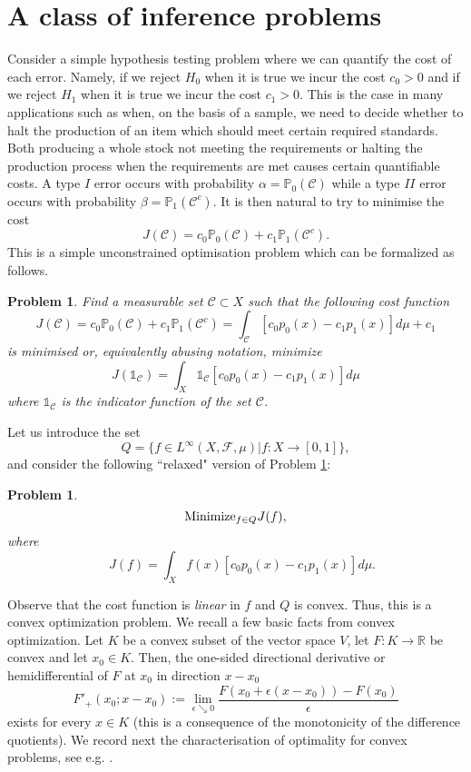 \documentclass[preprint,aps,showkeys,12pt]{revtex4}
\newtheorem{problem}[theorem]{Problem}
\begin{document}
\section{A class of inference problems}
Consider a simple hypothesis testing problem where we can quantify the cost of each error. Namely, if we reject $H_0$ when it is true we incur the cost $c_0>0$ and if we reject $H_1$ when it is true we incur the cost $c_1>0$. This is the case in many applications such as when, on the basis of a sample, we need to decide whether to halt the production of an item which should meet certain required standards. Both producing a whole stock not meeting the requirements or halting the production process when the requirements are met causes certain quantifiable costs. A type $I$ error occurs with probability $\alpha={\mathbb{P}}_0(\mathcal C)$ while a type $II$ error occurs  with probability $\beta={\mathbb{P}}_1(\mathcal C^c)$. It is then natural to try to minimise the cost
$$J (\mathcal C)=c_0{\mathbb{P}}_0(\mathcal C)+c_1{\mathbb{P}}_1(\mathcal C^c).
$$
This is a simple unconstrained optimisation problem which can be formalized as follows.
\begin{problem} \label{1}Find a measurable set $\mathcal C\subset X$ such that the following cost function
$$J(\mathcal C)=c_0{\mathbb{P}}_0(\mathcal C)+c_1{\mathbb{P}}_1(\mathcal C^c)=\int_{\mathcal C}\left[c_0 p_0(x)-c_1p_1(x)\right]d\mu +c_1
$$
is minimised or, equivalently abusing notation, minimize
$$J (\mathds{1}_{\mathcal C})=\int_X\mathds{1}_{\mathcal C}\left[c_0 p_0(x)-c_1p_1(x)\right]d\mu
$$
where $\mathds{1}_{\mathcal C}$ is the indicator function of the set $\mathcal C$. 
\end{problem}

Let us introduce the set 
$$Q=\{f\in L^\infty(X,\mathcal F,\mu) |f:X\rightarrow [0,1]\},
$$
and consider the following ``relaxed" version of Problem \ref{1}:
\begin{problem}\label{2}
$${\rm Minimize}_{f\in Q} J(f),
$$
where
$$\quad J(f)=\int_X f(x)\left[c_0 p_0(x)-c_1p_1(x)\right]d\mu.$$
\end{problem}
Observe that the cost function is {\em linear} in $f$ and $Q$ is convex. Thus, this is a convex optimization problem. We recall a few basic facts from convex optimization. Let $K$ be a convex subset of the vector space $V$, let $F:K\rightarrow {\mathbb{R}}$ be  convex and let $x_0\in K$. Then, the one-sided directional derivative or hemidifferential of $F$ at $x_0$ in direction $x-x_0$ 
$$F'_+(x_0;x-x_0):=\lim_{\epsilon\searrow 0}\frac{F(x_0+\epsilon(x-x_0))-F(x_0)}{\epsilon}
$$
exists for every $x\in K$ (this is a consequence of the monotonicity of the difference quotients). We record next the characterisation of optimality for convex problems, see e.g. \cite[p.66]{K}.
\end{document}
